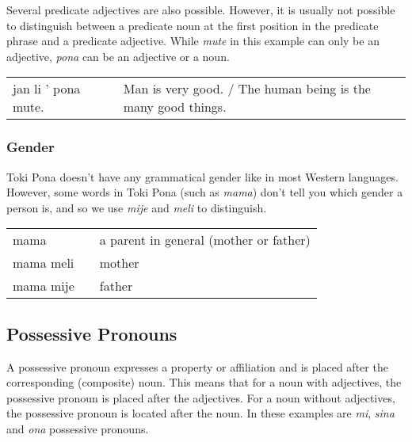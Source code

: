%
Several predicate adjectives are also possible. 
However, it is usually not possible to distinguish between a predicate noun at the first position in the predicate phrase and a predicate adjective. 
While \textit{mute} in this example can only be an adjective, \textit{pona} can be an adjective or a noun. 

\begin{supertabular}{p{5,5cm}|ll}
jan li ' pona mute. &&  Man is very good. / The human being is the many good things. \\
\end{supertabular} 

\subsubsection*{Gender}
%
%
Toki Pona doesn't have any grammatical gender like in most Western languages.  
However, some words in Toki Pona (such as \textit{mama}) don't tell you which gender a person is, and so we use \textit{mije} and \textit{meli} to distinguish. 

\begin{supertabular}{p{5,5cm}|ll}
mama && a parent in general (mother or father) \\
mama meli && mother \\
mama mije && father \\
\end{supertabular} 

%
\subsection*{Possessive Pronouns}
%

A possessive pronoun expresses a property or affiliation and is placed after the corresponding (composite) noun. 
This means that for a noun with adjectives, the possessive pronoun is placed after the adjectives. 
For a noun without adjectives, the possessive pronoun is located after the noun.
In these examples are \textit{mi}, \textit{sina} and \textit{ona} possessive pronouns. 

